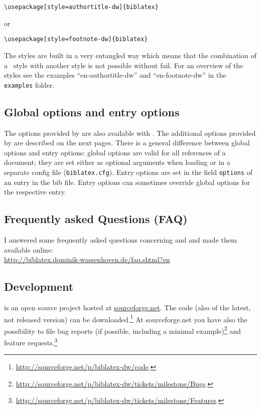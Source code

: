 \documentclass[english]{scrartcl}
\begin{document}
\begin{lstlisting} 
\usepackage[style=authortitle-dw]{biblatex}
\end{lstlisting}
or
\begin{lstlisting} 
\usepackage[style=footnote-dw]{biblatex}
\end{lstlisting}
The styles are built in a very entangled way which means that the combination of a \bldw\ style with another style is not possible without fail.
For an overview of the styles see the examples \enquote{en-authortitle-dw}
 and \enquote{en-footnote-dw} in the \texttt{examples} folder.

\subsection{Global options and entry options}
The options provided by \bl{} are also available with \bldw{}.
The additional options provided by \bldw{} are described on the next pages. 
There is a general difference between global options and entry options:
global options are valid for all references of a document; they are set
either as optional arguments when loading \bl{} or in a separate config
file (\texttt{biblatex.cfg}). Entry options are set in the field
\texttt{options} of an entry in the bib file. Entry options can sometimes override
global options for the respective entry.

\subsection{Frequently asked Questions (FAQ)}
I answered some frequently asked questions concerning \bl{} and \bldw{} and made them
available online:\\
\url{http://biblatex.dominik-wassenhoven.de/faq.shtml?en}

\subsection{Development}
\bldw{} is an open source project hosted at \href{http://sourceforge.net}{sourceforge.net}. The code (also of the latest, not released version) can be downloaded.\footnote{\url{http://sourceforge.net/p/biblatex-dw/code}.} At sourceforge.net you have also the possibility to file bug reports (if possible, including a minimal example)\footnote{\url{http://sourceforge.net/p/biblatex-dw/tickets/milestone/Bugs}.} and feature requests.\footnote{\url{http://sourceforge.net/p/biblatex-dw/tickets/milestone/Features}.}
\end{document}
